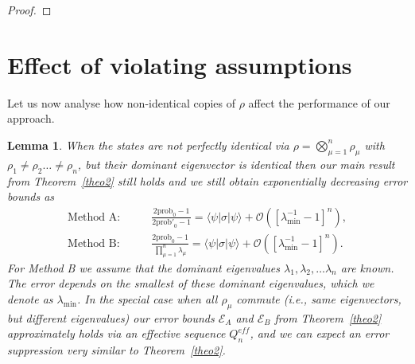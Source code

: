 \documentclass[aps,prx,showpacs,twocolumn,reprint]{revtex4-2}
\newtheorem{lemma}{Lemma}
\begin{document}
{\begin{proof}
	
\end{proof}



\clearpage

\section{Effect of violating assumptions}

Let us now analyse how non-identical copies of $\rho$ affect the
performance of our approach.

\begin{lemma}\label{differentlemma}
	When the states are not perfectly identical via $\rho = \bigotimes_{\mu=1}^n\rho_\mu$
	with $\rho_1 \neq \rho_2 \dots \neq \rho_n$, but their dominant eigenvector is identical
	then our main result from Theorem~\ref{theo2} still holds and we still obtain exponentially
	decreasing error bounds as
	\begin{align*}
	\text{Method A:}& \quad \quad
	\frac{2\mathrm{prob}_0-1}{2\mathrm{prob'}_0-1}
	=  \langle \psi  | \sigma | \psi \rangle  +  \mathcal{O}([\lambda_\mathrm{min}^{-1}{-}1]^n),\\
	\text{Method B:}& \quad \quad
	\frac{2\mathrm{prob}_0-1}{\prod_{\mu=1}^n \lambda_\mu}
	=  \langle \psi  | \sigma | \psi \rangle  +  \mathcal{O}([\lambda_\mathrm{min}^{-1}{-}1]^n).
	\end{align*}
	For Method B we assume that the dominant eigenvalues $\lambda_1, \lambda_2, \dots \lambda_n$ are known.
	The error depends on the smallest of these dominant eigenvalues, which we denote as $\lambda_\mathrm{min}$.
	In the special case when all $\rho_\mu$ commute (i.e., same eigenvectors, but different eigenvalues)
	our error bounds $\mathcal{E}_A$ and $\mathcal{E}_B$ from Theorem~\ref{theo2} approximately
	holds via an effective sequence $Q_n^{eff}$, and we can expect an error suppression
	very similar to Theorem~\ref{theo2}.
\end{lemma}

}
\end{document}
